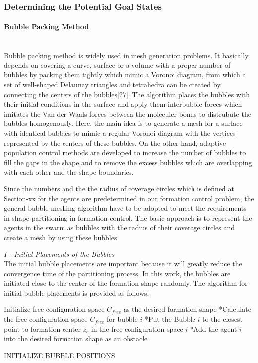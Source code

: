 \subsubsection{Determining the Potential Goal States}
\paragraph{Bubble Packing Method} \hspace{0pt} \\				
Bubble packing method is widely used in mesh generation problems. It basically depends on covering a curve, surface or a volume with a proper number of bubbles by packing them tightly which mimic a Voronoi diagram, from which a set of well-shaped Delaunay triangles and tetrahedra can be created by connecting the centers of the bubbles[27].  The algorithm places the bubbles with their initial conditions in the surface and apply them interbubble forces which imitates the Van der Waals forces between the moleculer bonds  to distrubute the bubbles homogenously. Here, the main idea is to generate a mesh for a surface with identical bubbles to mimic a regular Voronoi diagram with the vertices represented by the centers of these bubbles. On the other hand, adaptive population control  methods are developed to increase the number of bubbles to fill the gaps in the shape and to remove the excess bubbles which are overlapping with each other and the shape boundaries. 

Since the numbers and the the radius of coverage circles which is defined at Section-xx for the agents are predetermined in our formation control problem, the general bubble meshing algorithm have to be adopted to meet the requirements in shape partitioning in formation control.  The basic approach is to represent the agents in the swarm as bubbles with the radius of  their coverage circles and create a mesh by using these bubbles. \newline
			
\textit{			I - Initial Placements of the Bubbles} \\ 
The initial bubble placements are important because it will greatly reduce the convergence time of the partitioning process. In this work, the bubbles are initiated close to the center of the formation shape randomly. The algorithm for initial bubble placements is provided as follows:
			
\begin{algorithm}[H]
Initialize free configuration space $C_{free}$ as the desired formation shape
{		
*Calculate the free configuration space $C_{free}$ for bubble $i$\;
*Put the Bubble $i$ to the closest point to  formation center  $z_c$  in the free configuration space $i$ \;
*Add the agent $i$ into the desired formation shape as an obstacle \;
}
				
\caption{INITIALIZE$\_$BUBBLE$\_$POSITIONS}
\end{algorithm}
		
